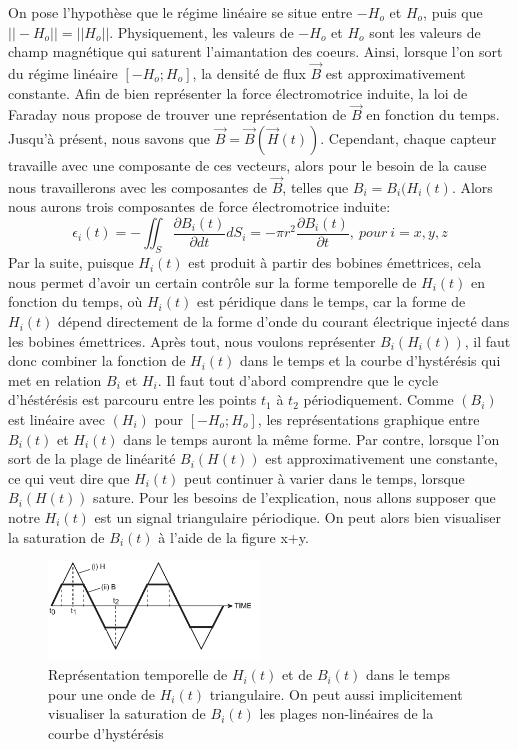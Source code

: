 \documentclass{standalone}
\begin{document}
On pose l'hypothèse que le régime linéaire se situe entre $-H_o$ et $H_o$, puis que $||-H_o||=||H_o||$. Physiquement, les valeurs de $-H_o$ et $H_o$ sont  les valeurs de champ magnétique qui saturent l'aimantation des coeurs. Ainsi, lorsque l'on sort du régime linéaire $[-H_o;H_o]$, la densité de flux $\vec{B}$ est approximativement constante. Afin de bien représenter la force électromotrice induite, la loi de Faraday nous propose de trouver une représentation de $\vec{B}$ en fonction du temps. Jusqu'à présent, nous savons que $\vec{B} = \vec{B}(\vec{H}(t)) $. Cependant, chaque capteur travaille avec une composante de ces vecteurs, alors pour le besoin de la cause nous travaillerons avec les composantes de $\vec{B}$, telles que $B_i = B_i(H_i(t)$. Alors nous aurons trois composantes de force électromotrice induite:
\begin{equation}
\epsilon_i(t) = - \iint_S  \frac{\partial B_i(t)}{\partial dt}{dS_i}= -\pi r^2 \frac{\partial B_i(t)}{\partial t}   ,\ pour \ i=x,y,z 
\end{equation}
Par la suite, puisque $H_i(t)$ est produit à partir des bobines émettrices, cela  
nous permet d'avoir un certain contrôle sur la forme temporelle de $H_i(t)$ en fonction du temps, où $H_i(t)$ est péridique dans le temps, car la forme de $H_i(t)$ dépend directement de la forme d'onde du courant électrique injecté dans les bobines émettrices.
Après tout, nous voulons représenter $B_i(H_i(t))$, il faut donc combiner la fonction de $H_i(t)$ dans le temps et la courbe d'hystérésis qui met en relation $B_i$ et $H_i$. Il faut tout d'abord comprendre que le cycle d'héstérésis est parcouru entre les points $t_1$ à $t_2$ périodiquement. Comme $(B_i)$ est linéaire avec $(H_i)$ pour $[-H_o;H_o]$, les représentations graphique entre $B_i(t)$ et $H_i(t)$ dans le temps auront la même forme.  Par contre, lorsque l'on sort de la plage de linéarité $B_i(H(t))$ est approximativement une constante, ce qui veut dire que $H_i(t)$ peut continuer à varier dans le temps, lorsque $B_i(H(t))$ sature. Pour les besoins de l'explication, nous allons supposer que notre $H_i(t)$ est un signal triangulaire périodique. On peut alors bien visualiser la saturation de $B_i(t)$ à l'aide de la figure x+y.




\begin{figure}[h]
\begin{center}
\includegraphics[width=0.50\textwidth]{saturation}
\caption{Représentation temporelle de $H_i(t)$ et de $B_i(t)$ dans le temps pour une onde de $H_i(t)$ triangulaire. On peut aussi implicitement visualiser la saturation de $B_i(t)$ les plages non-linéaires de la courbe d'hystérésis}
\end{center}
\end{figure} 
\end{document}
